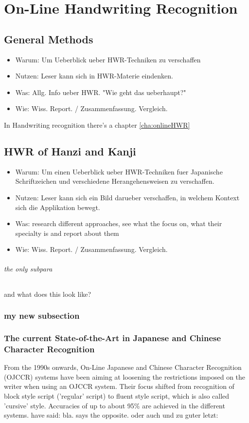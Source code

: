 
\chapter{On-Line Handwriting Recognition}
\label{chap:onlinehwr}
  
\section{General Methods}
\label{sec:generalmethods}

\begin{itemize}
\item Warum: Um Ueberblick ueber HWR-Techniken zu verschaffen
\item Nutzen: Leser kann sich in HWR-Materie eindenken.
\item Was: Allg. Info ueber HWR. "Wie geht das ueberhaupt?"
\item Wie: Wiss. Report. / Zusammenfassung. Vergleich.
\end{itemize}

In Handwriting recognition there's a chapter \ref{cha:onlineHWR} 

\section{HWR of Hanzi and Kanji}
\begin{itemize}
\item Warum: Um einen Ueberblick ueber HWR-Techniken fuer Japanische 
  Schriftzeichen und verschiedene Herangehensweisen zu verschaffen.
\item Nutzen: Leser kann sich ein Bild darueber verschaffen,
  in welchem Kontext sich die Applikation bewegt.
\item Was: research different approaches, see what the focus on, 
  what their specialty is and report about them
\item Wie: Wiss. Report. / Zusammenfassung. Vergleich.
\end{itemize}

\subparagraph{the only subpara}

and what does this look like?

\subsection{my new subsection}
\label{sec:mynewsub}


\subsection{The current State-of-the-Art in Japanese and Chinese Character Recognition}
From the 1990s onwards, On-Line Japanese and Chinese Character Recognition 
(OJCCR) systems have been aiming at loosening the restrictions imposed on 
the writer when using an OJCCR system. Their focus shifted from recognition 
of block style script ('regular' script) to fluent style script, 
which is also called 'cursive' style. Accuracies of up to about 95\% are
achieved in the different systems. \cite{LiuJaegerNakagawa2004} have said: 
bla. \cite{Tappert1990} says the opposite. \cite{ChenLee1996} oder auch 
\cite{Nakagawa2008} und \cite{Nakai2003} zu guter letzt: \cite{Santosh2009}

